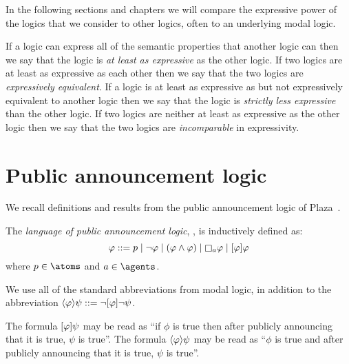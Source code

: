 In the following sections and chapters we will compare the expressive power of the logics that we consider to other logics, often to an underlying modal logic.

\begin{definition}[Expressivity]
If a logic can express all of the semantic properties that another logic can then we say that the logic is {\em at least as expressive} as the other logic.
If two logics are at least as expressive as each other then we say that the two logics are {\em expressively equivalent}.
If a logic is at least as expressive as but not expressively equivalent to another logic then we say that the logic is {\em strictly less expressive} than the other logic.
If two logics are neither at least as expressive as the other logic then we say that the two logics are {\em incomparable} in expressivity.
\end{definition}

\section{Public announcement logic}\label{pal}

We recall definitions and results from the public announcement logic of Plaza~\cite{plaza:1989}.

\begin{definition}
The {\em language of public announcement logic}, \langPal{}, is inductively defined as:
$$
\phi ::= 
    \atomP \mid
    \lnot \phi \mid
    (\phi \land \phi) \mid
    \necessaryA \phi \mid
    \announceA{\phi} \phi
$$
where $\atomP \in \atoms$ and $\agentA \in \agents$.
\end{definition}

We use all of the standard abbreviations from modal logic, in addition to the abbreviation $\langle \varphi \rangle \psi ::= \lnot [ \varphi ] \lnot \psi$.

The formula $[ \varphi ] \psi$ may be read as ``if $\phi$ is true then after publicly announcing that it is true, $\psi$ is true''.
The formula $\langle \varphi \rangle \psi$ may be read as ``$\phi$ is true and after publicly announcing that it is true, $\psi$ is true''.

